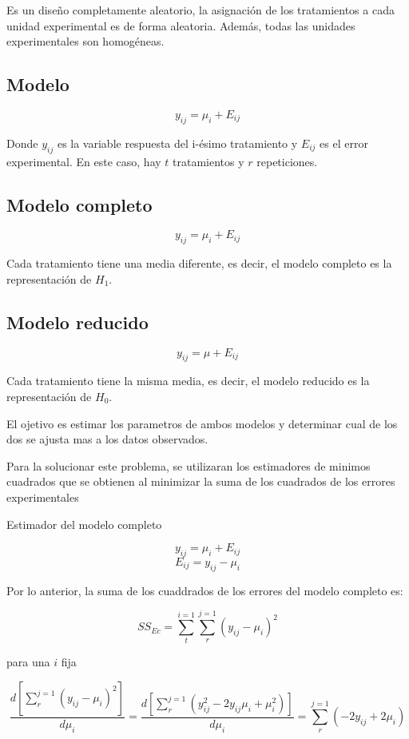 \documentclass{article}
\begin{document}
Es un diseño completamente aleatorio, la asignación de los tratamientos a cada unidad experimental es de forma aleatoria. Además, todas las unidades experimentales son homogéneas.

\subsection{Modelo}

\[y_{ij} = \mu_i + E_{ij}\]

Donde \(y_{ij}\) es la variable respuesta del i-ésimo tratamiento y \(E_{ij}\) es el error experimental. En este caso, hay \(t\) tratamientos y \(r\) repeticiones.

\subsection{Modelo completo}

\[y_{ij} = \mu_i + E_{ij}\]

Cada tratamiento tiene una media diferente, es decir, el modelo completo es la representación de \(H_1\).

\subsection{Modelo reducido}

\[y_{ij} = \mu + E_{ij}\]

Cada tratamiento tiene la misma media, es decir, el modelo reducido es la representación de \(H_0\).

El ojetivo es estimar los parametros de ambos modelos y determinar cual de los dos se ajusta mas a los datos observados.

Para la solucionar este problema, se utilizaran los estimadores de minimos cuadrados que se obtienen al minimizar la suma de los cuadrados de los errores experimentales

Estimador del modelo completo

\[y_{ij} = \mu_{i} + E_{ij}\]
\[E_{ij} = y_{ij} - \mu_{i}\]

Por lo anterior, la suma de los cuaddrados de los errores del modelo completo es:

\[ SS_{Ec} = \sum_{t}^{i=1} \sum_{r}^{j=1} (y_{ij} - \mu_{i})^2\]

para una $i$ fija

\[
    \frac{d[\sum_{r}^{j=1}(y_{ij} - \mu_{i})^2]}{d\mu_i} = \frac{d [\sum_{r}^{j=1} (y^{2}_{ij} - 2y_{ij}\mu_{i} + \mu^2_{i})]}{d\mu_i} = \sum_{r}^{j=1}(-2y_{ij} + 2\mu_i)
\]
\end{document}
